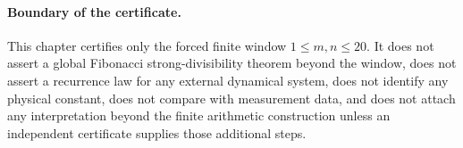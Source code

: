 \paragraph{Boundary of the certificate.}
This chapter certifies only the forced finite window $1\leq m,n\leq20$.  It does not assert a global Fibonacci strong-divisibility theorem beyond the window, does not assert a recurrence law for any external dynamical system, does not identify any physical constant, does not compare with measurement data, and does not attach any interpretation beyond the finite arithmetic construction unless an independent certificate supplies those additional steps.